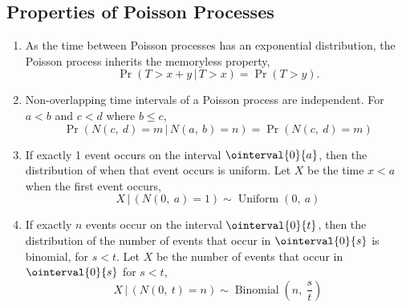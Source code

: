 \documentclass{article}
\begin{document}
\subsection{Properties of Poisson Processes}
\begin{enumerate}
    \item As the time between Poisson processes has an exponential
          distribution, the Poisson process inherits the memoryless
          property,
          \begin{equation*}
              \Pr{\left( T > x + y \,\vert\, T > x \right)} = \Pr{\left( T > y \right)}.
          \end{equation*}
    \item Non-overlapping time intervals of a Poisson process are
          independent. For \(a < b\) and \(c < d\) where \(b \leq c\),
          \begin{equation*}
              \Pr{\left( N\left( c,\: d \right) = m \,\vert\, N\left( a,\: b \right) = n \right)} = \Pr{\left( N\left( c,\: d \right) = m \right)}
          \end{equation*}
    \item\label{poisson_property_1_event} If exactly 1 event occurs on the interval \(\ointerval{0}{a}\), then the distribution of when that event occurs is
          uniform. Let \(X\) be the time \(x < a\) when the first event occurs,
          \begin{equation*}
              X \,\vert\, \left( N\left( 0,\: a \right) = 1 \right) \sim \operatorname{Uniform}{\left( 0,\: a \right)}
          \end{equation*}
    \item\label{poisson_property_n_events} If exactly \(n\) events occur on the interval \(\ointerval{0}{t}\), then the distribution of the number of events
          that occur in \(\ointerval{0}{s}\) is binomial, for \(s < t\). Let \(X\) be the number of events that occur in \(\ointerval{0}{s}\) for \(s < t\),
          \begin{equation*}
              X \,\vert\, \left( N\left( 0,\: t \right) = n \right) \sim \operatorname{Binomial}{\left( n,\: \frac{s}{t} \right)}
          \end{equation*}
\end{enumerate}
\end{document}
